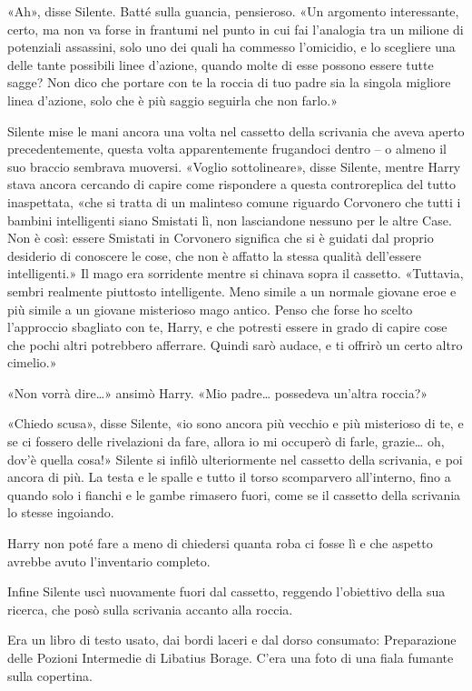 «Ah», disse Silente. Batté sulla guancia, pensieroso. «Un argomento interessante, certo, ma non va forse in frantumi nel punto in cui fai l’analogia tra un milione di potenziali assassini, solo uno dei quali ha commesso l’omicidio, e lo scegliere una delle tante possibili linee d’azione, quando molte di esse possono essere tutte sagge? Non dico che portare con te la roccia di tuo padre sia la singola migliore linea d’azione, solo che è più saggio seguirla che non farlo.»

Silente mise le mani ancora una volta nel cassetto della scrivania che aveva aperto precedentemente, questa volta apparentemente frugandoci dentro – o almeno il suo braccio sembrava muoversi. «Voglio sottolineare», disse Silente, mentre Harry stava ancora cercando di capire come rispondere a questa controreplica del tutto inaspettata, «che si tratta di un malinteso comune riguardo Corvonero che tutti i bambini intelligenti siano Smistati lì, non lasciandone nessuno per le altre Case. Non è così: essere Smistati in Corvonero significa che si è guidati dal proprio desiderio di conoscere le cose, che non è affatto la stessa qualità dell’essere intelligenti.» Il mago era sorridente mentre si chinava sopra il cassetto. «Tuttavia, sembri realmente piuttosto intelligente. Meno simile a un normale giovane eroe e più simile a un giovane misterioso mago antico. Penso che forse ho scelto l’approccio sbagliato con te, Harry, e che potresti essere in grado di capire cose che pochi altri potrebbero afferrare. Quindi sarò audace, e ti offrirò un certo altro cimelio.»

«Non vorrà dire…» ansimò Harry. «Mio padre… possedeva un’altra roccia?»

«Chiedo scusa», disse Silente, «io sono ancora più vecchio e più misterioso di te, e se ci fossero delle rivelazioni da fare, allora io mi occuperò di farle, grazie… oh, dov’è quella cosa!» Silente si infilò ulteriormente nel cassetto della scrivania, e poi ancora di più. La testa e le spalle e tutto il torso scomparvero all’interno, fino a quando solo i fianchi e le gambe rimasero fuori, come se il cassetto della scrivania lo stesse ingoiando.

Harry non poté fare a meno di chiedersi quanta roba ci fosse lì e che aspetto avrebbe avuto l’inventario completo.

Infine Silente uscì nuovamente fuori dal cassetto, reggendo l’obiettivo della sua ricerca, che posò sulla scrivania accanto alla roccia.

Era un libro di testo usato, dai bordi laceri e dal dorso consumato: Preparazione delle Pozioni Intermedie di Libatius Borage. C’era una foto di una fiala fumante sulla copertina.

